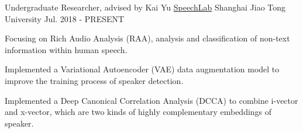\begin{cventries}
	\cventry
	{Undergraduate Researcher, advised by Kai Yu}
	{\href{https://speechlab.sjtu.edu.cn/}{SpeechLab}}
	{Shanghai Jiao Tong University}
	{Jul. 2018 - PRESENT}
	{
		\begin{cvitems}
			\item {Focusing on Rich Audio Analysis (RAA), analysis and classification of non-text information within human speech.}
            \item {Implemented a Variational Autoencoder (VAE) data augmentation model to improve the training process of speaker detection.}
            \item {Implemented a Deep Canonical Correlation Analysis (DCCA) to combine i-vector and x-vector, which are two kinds of highly complementary embeddings of speaker.}
		\end{cvitems}
	}
\end{cventries}
